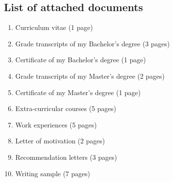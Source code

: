 \documentclass[11pt]{FreemanC}
\begin{document}
\begin{paracol}{2}

\switchcolumn 

\bigskip

\section{List of attached documents}

\begin{enumerate}
	\item Curriculum vitae (1 page)
	\item Grade transcripts of my Bachelor's degree (3 pages)
	\item Certificate of my Bachelor's degree (1 page)
	\item Grade transcripts of my Master's degree (2 pages)
	\item Certificate of my Master's degree (1 page) 
	\item Extra-curricular courses (5 pages)
	\item Work experiences (5 pages)
	\item Letter of motivation (2 pages) 
	\item Recommendation letters (3 pages) 
	\item Writing sample (7 pages)
\end{enumerate}

\end{paracol}
\end{document}
